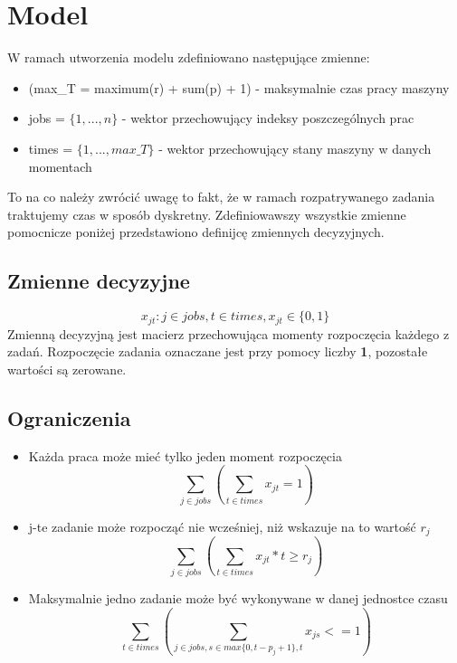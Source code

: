 \documentclass[a4paper,14pt]{report}
\begin{document}
\section{Model}
    W ramach utworzenia modelu zdefiniowano następujące zmienne:
    \begin{itemize}
        \item (max\_T = maximum(r) + sum(p) + 1) - maksymalnie czas pracy maszyny
        \item jobs = $\{1,...,n\}$ - wektor przechowujący indeksy poszczególnych prac
        \item times = $\{1,...,max\_T\}$ - wektor przechowujący stany maszyny w danych momentach 
    \end{itemize}
    To na co należy zwrócić uwagę to fakt, że w ramach rozpatrywanego zadania traktujemy czas w sposób dyskretny.
    Zdefiniowawszy wszystkie zmienne pomocnicze poniżej przedstawiono definijcę zmiennych decyzyjnych.
    \subsection{Zmienne decyzyjne}
        \begin{equation}
            x_{jt} : j \in jobs, t \in times, x_{jt} \in \{0,1\}
        \end{equation}
        Zmienną decyzyjną jest macierz przechowująca momenty rozpoczęcia każdego z zadań.
        Rozpoczęcie zadania oznaczane jest przy pomocy liczby \textbf{1}, pozostałe wartości 
        są zerowane.
    \subsection{Ograniczenia}
        \begin{itemize}
            \item Każda praca może mieć tylko jeden moment rozpoczęcia 
                \begin{equation}
                    \sum_{j \in jobs} (\sum_{t \in times} x_{jt} = 1 )
                \end{equation}
            \item j-te zadanie może rozpocząć nie wcześniej, niż wskazuje na to wartość $r_{j}$
                \begin{equation}
                    \sum_{j \in jobs} (\sum_{t \in times} x_{jt}*t \geq r_{j})
                \end{equation}
            \item Maksymalnie jedno zadanie może być wykonywane w danej jednostce czasu
                \begin{equation}
                    \sum_{t \in times} (\sum_{j \in jobs, s \in max\{0,t-p_{j}+1 \}, t} x_{js} <= 1)
                \end{equation}
        \end{itemize}
\end{document}
